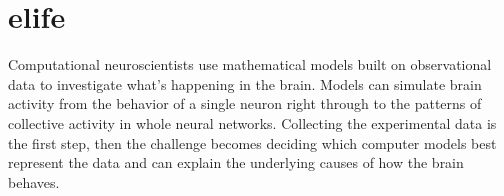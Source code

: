 








\section{elife}
Computational neuroscientists use mathematical models built on observational data to investigate what’s happening in the brain. Models can simulate brain activity from the behavior of a single neuron right through to the patterns of collective activity in whole neural networks. Collecting the experimental data is the first step, then the challenge becomes deciding which computer models best represent the data and can explain the underlying causes of how the brain behaves.

